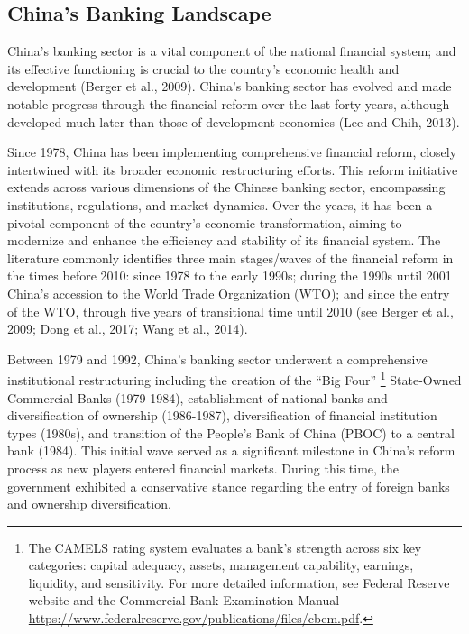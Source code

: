 \documentclass[
  12pt,
  a4paper,
]{scrreprt}
\begin{document}
\subsection{China's Banking Landscape}\label{chinas-banking-landscape}

China's banking sector is a vital component of the national financial
system; and its effective functioning is crucial to the country's
economic health and development (Berger et al., 2009). China's banking
sector has evolved and made notable progress through the financial
reform over the last forty years, although developed much later than
those of development economies (Lee and Chih, 2013).

Since 1978, China has been implementing comprehensive financial reform,
closely intertwined with its broader economic restructuring efforts.
This reform initiative extends across various dimensions of the Chinese
banking sector, encompassing institutions, regulations, and market
dynamics. Over the years, it has been a pivotal component of the
country's economic transformation, aiming to modernize and enhance the
efficiency and stability of its financial system. The literature
commonly identifies three main stages/waves of the financial reform in
the times before 2010: since 1978 to the early 1990s; during the 1990s
until 2001 China's accession to the World Trade Organization (WTO); and
since the entry of the WTO, through five years of transitional time
until 2010 (see Berger et al., 2009; Dong et al., 2017; Wang et al.,
2014).

Between 1979 and 1992, China's banking sector underwent a comprehensive
institutional restructuring including the creation of the ``Big Four''
\footnote{The CAMELS rating system evaluates a bank's strength across
  six key categories: capital adequacy, assets, management capability,
  earnings, liquidity, and sensitivity. For more detailed information,
  see Federal Reserve website and the Commercial Bank Examination Manual
  \url{https://www.federalreserve.gov/publications/files/cbem.pdf}.}
State-Owned Commercial Banks (1979-1984), establishment of national
banks and diversification of ownership (1986-1987), diversification of
financial institution types (1980s), and transition of the People's Bank
of China (PBOC) to a central bank (1984). This initial wave served as a
significant milestone in China's reform process as new players entered
financial markets. During this time, the government exhibited a
conservative stance regarding the entry of foreign banks and ownership
diversification.
\end{document}

